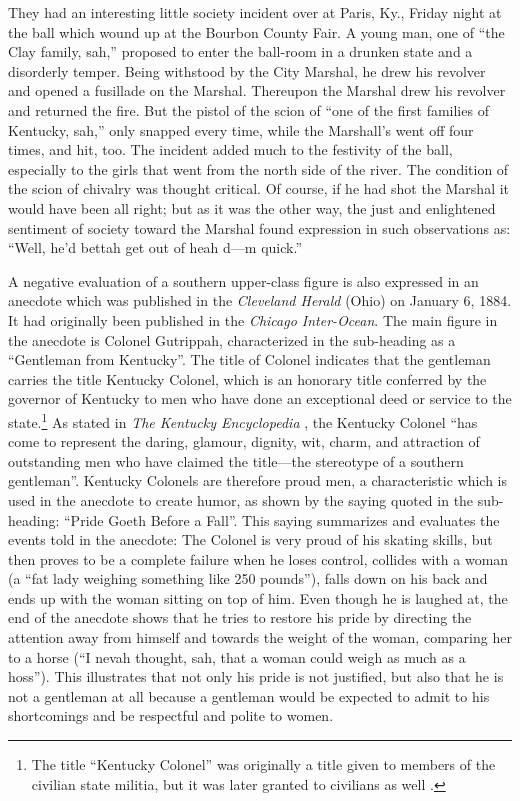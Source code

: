 \begin{ipquote}
They had an interesting little society incident over at Paris, Ky., Friday night at the ball which wound up at the Bourbon County Fair. A young man, one of “the Clay family, sah,” proposed to enter the ball-room in a drunken state and a disorderly temper. Being withstood by the City Marshal, he drew his revolver and opened a fusillade on the Marshal. Thereupon the Marshal drew his revolver and returned the fire. But the pistol of the scion of “one of the first families of Kentucky, sah,” only snapped every time, while the Marshall’s went off four times, and hit, too. The incident added much to the festivity of the ball, especially to the girls that went from the north side of the river. The condition of the scion of chivalry was thought critical. Of course, if he had shot the Marshal it would have been all right; but as it was the other way, the just and enlightened sentiment of society toward the Marshal found expression in such observations as: “Well, he’d bettah get out of heah d—m quick.”
\end{ipquote}

A negative evaluation of a southern upper-class figure is also expressed in an anecdote which was published in the \emph{Cleveland Herald} (Ohio) on January 6, 1884. It had originally been published in the \emph{Chicago Inter-Ocean}. The main figure in the anecdote is Colonel Gutrippah, characterized in the sub-heading as a “Gentleman from Kentucky”. The title of Colonel indicates that the gentleman carries the title Kentucky Colonel, which is an honorary title conferred by the governor of Kentucky to men who have done an exceptional deed or service to the state.\footnote{The title “Kentucky Colonel” was originally a title given to members of the civilian state militia, but it was later granted to civilians as well \citep[493]{Kleber1992}.} As stated in \emph{The Kentucky Encyclopedia} \citep[493]{Kleber1992}, the Kentucky Colonel “has come to represent the daring, glamour, dignity, wit, charm, and attraction of outstanding men who have claimed the title—the stereotype of a southern gentleman”. Kentucky Colonels are therefore proud men, a characteristic which is used in the anecdote to create humor, as shown by the saying quoted in the sub-heading: “Pride Goeth Before a Fall”. This saying summarizes and evaluates the events told in the anecdote: The Colonel is very proud of his skating skills, but then proves to be a complete failure when he loses control, collides with a woman (a “fat lady weighing something like 250 pounds”), falls down on his back and ends up with the woman sitting on top of him. Even though he is laughed at, the end of the anecdote shows that he tries to restore his pride by directing the attention away from himself and towards the weight of the woman, comparing her to a horse (“I nevah thought, sah, that a woman could weigh as much as a hoss”). This illustrates that not only his pride is not justified, but also that he is not a gentleman at all because a gentleman would be expected to admit to his shortcomings and be respectful and polite to women.

